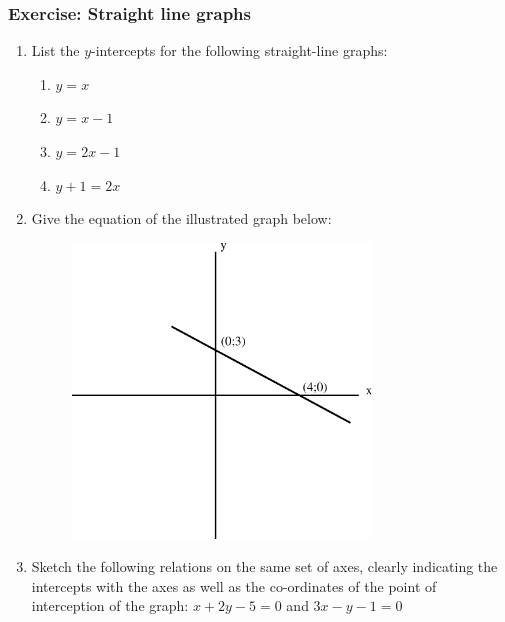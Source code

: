             \subsubsection{ Exercise: Straight line graphs }
            \nopagebreak
          \label{m39338*id239994}\begin{enumerate}[noitemsep, label=\textbf{\arabic*}. ] 
            \label{m39338*uid94}\item List the $y$-intercepts for the following straight-line graphs:
\label{m39338*id240020}\begin{enumerate}[noitemsep, label=\textbf{\alph*}. ] 
            \label{m39338*uid95}\item $y=x$\label{m39338*uid96}\item $y=x-1$\label{m39338*uid97}\item $y=2x-1$\label{m39338*uid98}\item $y+1=2x$\end{enumerate}
                \label{m39338*uid99}\item Give the equation of the illustrated graph below:
    \setcounter{subfigure}{0}
	\begin{figure}[H] %
    \begin{center}
    \label{m39338*id240155!!!underscore!!!media}\label{m39338*id240155!!!underscore!!!printimage}\includegraphics[width=300px]{col11306.imgs/m39338_MG10C11_012.png} %
      \vspace{2pt}
    \vspace{.1in}
    \end{center}
 \end{figure}               \label{m39338*uid100}\item Sketch the following relations on the same set of axes, clearly indicating the intercepts with the axes as well as the co-ordinates of the point of interception of the graph:
$x+2y-5=0$ and $3x-y-1=0$\newline
            \end{enumerate}
